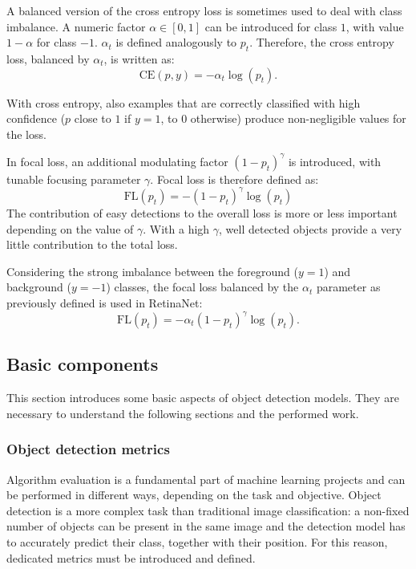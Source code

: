 \documentclass[%
    corpo=12pt,
    twoside,
    stile=classica,   
    tipotesi=magistrale,
    evenboxes,
    english,
	numerazioneromana,
]{toptesi}
\begin{document}
\bigskip
A balanced version of the cross entropy loss is sometimes used to deal with class imbalance. A numeric factor $\alpha\in\left[0,1\right]$ can be introduced for class $1$, with value $1-\alpha$ for class $-1$. $\alpha_t$ is defined analogously to $p_t$. Therefore, the cross entropy loss, balanced by $\alpha_t$, is written as:
\begin{equation}
	\text{CE}(p,y) = -\alpha_t\log(p_t).
\end{equation}

\bigskip
With cross entropy, also examples that are correctly classified with high confidence ($p$ close to $1$ if $y=1$, to $0$ otherwise) produce non-negligible values for the loss.

In focal loss, an additional modulating factor $\left(1-p_t\right)^\gamma$ is introduced, with tunable focusing parameter $\gamma$. Focal loss is therefore defined as:
\begin{equation}
	\text{FL}(p_t) = -\left(1-p_t\right)^\gamma \log(p_t)
\end{equation}
The contribution of easy detections to the overall loss is more or less important depending on the value of $\gamma$. With a high $\gamma$, well detected objects provide a very little contribution to the total loss.

Considering the strong imbalance between the foreground ($y=1$) and background ($y=-1$) classes, the focal loss balanced by the $\alpha_t$ parameter as previously defined is used in RetinaNet:
\begin{equation}
	\text{FL}(p_t) = -\alpha_t\left(1-p_t\right)^\gamma \log(p_t).
	\label{eq:focalloss}
\end{equation}

\subsection{Basic components}

This section introduces some basic aspects of object detection models. They are necessary to understand the following sections and the performed work.

\subsubsection{Object detection metrics}
Algorithm evaluation is a fundamental part of machine learning projects and can be performed in different ways, depending on the task and objective. Object detection is a more complex task than traditional image classification: a non-fixed number of objects can be present in the same image and the detection model has to accurately predict their class, together with their position. For this reason, dedicated metrics must be introduced and defined.
\end{document}
